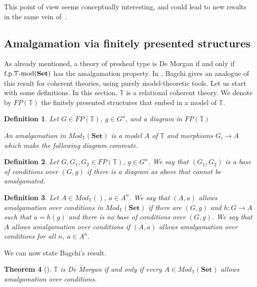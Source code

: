 \documentclass{article}
\newtheorem{theorem}{Theorem}
\newtheorem{definition}[theorem]{Definition}
\newcommand{\Set}{\mathbf{Set}}
\begin{document}
\noindent This point of view seems conceptually interesting, and could lead to new results in the same vein of~\cite{espindola2023every}. 

\subsection{Amalgamation via finitely presented structures}

As already mentioned, a theory of presheaf type is De Morgan if and only if $\textup{f.p.}\mathbb{T}\text{-}\textup{mod}(\Set)$ has the amalgamation property. In \cite{bagchi1992morgan}, Bagchi gives an analogue of this result for coherent theories, using purely model-theoretic tools. Let us start with some definitions. In this section, $\mathbb{T}$ is a relational coherent theory. We denote by $FP(\mathbb{T})$ the finitely presented structures that embed in a model of $\mathbb{T}$.
\begin{definition}
    Let $G\in FP(\mathbb{T})$, $g\in G^n$, and a diagram in $FP(\mathbb{T})$ 
    \begin{center}
    \end{center}
    An amalgamation in $Mod_\mathbb{T}(\Set)$ is a model $A$ of $\mathbb{T}$ and morphisms $G_i\xrightarrow{} A$ which make the following diagram commute.
    \begin{center}
    \end{center}
\end{definition}
\begin{definition}
    Let $G,G_1,G_2\in FP(\mathbb{T})$, $g\in G^n$. We say that $(G_1,G_2)$ is a base of conditions over $(G,g)$ if there is a diagram as above that cannot be amalgamated.
\end{definition}
\begin{definition}
    Let $A\in Mod_\mathbb{T}()$, $a\in A^n$. We say that $(A,a)$ allows amalgamation over conditions in $Mod_\mathbb{T}(\Set)$ if there are $(G,g)$ and $h:G\xrightarrow{}A$ such that $a=h(g)$ and there is no base of conditions over $(G,g)$. We say that $A$ allows amalgamation over conditions if $(A,a)$ allows amalgamation over conditions for all $n$, $a\in A^n$.
\end{definition}
We can now state Bagchi's result.
\begin{theorem}[\cite{bagchi1992morgan}]\label{bagchi2}
$\mathbb{T}$ is De Morgan if and only if every $A\in Mod_\mathbb{T}(\Set)$ allows amalgamation over conditions.    
\end{theorem}
\end{document}
